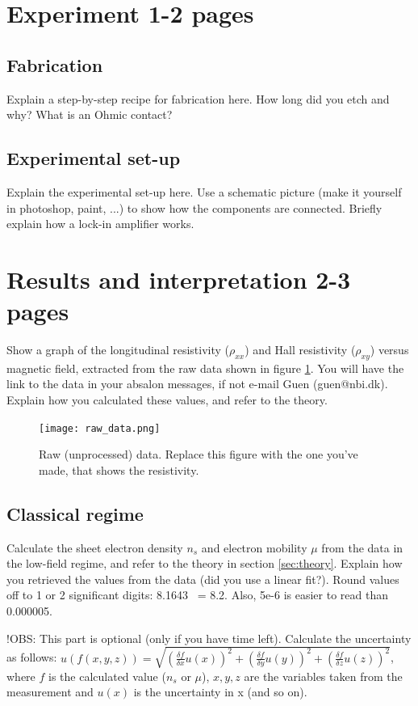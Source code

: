 \documentclass[a4paper]{article}
\begin{document}
\iffalse
\section{Experiment 1-2 pages}
\subsection{Fabrication}
Explain a step-by-step recipe for fabrication here. How long did you etch and why? What is an Ohmic contact?
\subsection{Experimental set-up}
Explain the experimental set-up here. Use a schematic picture (make it yourself in photoshop, paint, ...) to show how the components are connected. Briefly explain how a lock-in amplifier works.

\section{Results and interpretation 2-3 pages}
Show a graph of the longitudinal resistivity ($\rho_{xx}$) and Hall resistivity ($\rho_{xy}$) versus magnetic field, extracted from the raw data shown in figure \ref{fig:data}. You will have the link to the data in your absalon messages, if not e-mail Guen (guen@nbi.dk). Explain how you calculated these values, and refer to the theory.

\begin{figure}
\centering
\texttt{[image: raw\_data.png]}
\caption{\label{fig:data}Raw (unprocessed) data. Replace this figure with the one you've made, that shows the resistivity.}
\end{figure}

\subsection{Classical regime}
Calculate the sheet electron density $n_{s}$ and electron mobility $\mu$ from the data in the low-field regime, and refer to the theory in section \ref{sec:theory}. Explain how you retrieved the values from the data (did you use a linear fit?).
Round values off to 1 or 2 significant digits: 8.1643 ~= 8.2. Also, 5e-6 is easier to read than 0.000005.

!OBS: This part is optional (only if you have time left).
Calculate the uncertainty as follows: \newline $u(f(x, y, z)) = \sqrt{(\frac{\delta f}{\delta{x}} u(x))^{2} + (\frac{\delta f}{\delta{y}} u(y))^{2} + (\frac{\delta f}{\delta{z}} u(z))^{2}}$, where $f$ is the calculated value ($n_{s}$ or $\mu$), $x, y, z$ are the variables taken from the measurement and $u(x)$ is the uncertainty in x (and so on).
\end{document}
